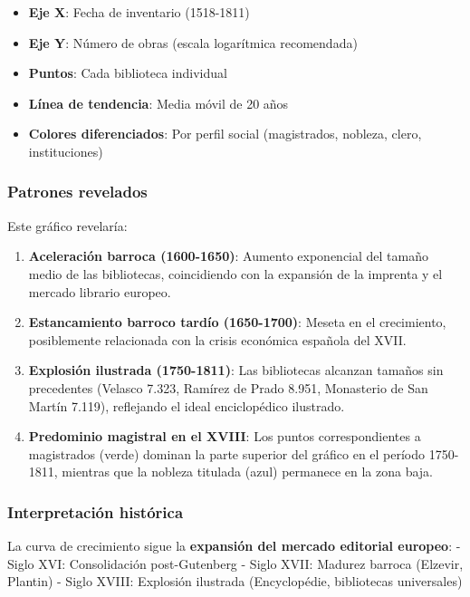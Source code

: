 \documentclass[11pt,a4paper]{article}
\begin{document}
\begin{itemize}
\item \textbf{Eje X}: Fecha de inventario (1518-1811)
\item \textbf{Eje Y}: Número de obras (escala logarítmica recomendada)
\item \textbf{Puntos}: Cada biblioteca individual
\item \textbf{Línea de tendencia}: Media móvil de 20 años
\item \textbf{Colores diferenciados}: Por perfil social (magistrados, nobleza, clero, instituciones)
\end{itemize}

\subsubsection{Patrones revelados}

Este gráfico revelaría:

\begin{enumerate}
\item \textbf{Aceleración barroca (1600-1650)}: Aumento exponencial del tamaño medio de las bibliotecas, coincidiendo con la expansión de la imprenta y el mercado librario europeo.

\item \textbf{Estancamiento barroco tardío (1650-1700)}: Meseta en el crecimiento, posiblemente relacionada con la crisis económica española del XVII.

\item \textbf{Explosión ilustrada (1750-1811)}: Las bibliotecas alcanzan tamaños sin precedentes (Velasco 7.323, Ramírez de Prado 8.951, Monasterio de San Martín 7.119), reflejando el ideal enciclopédico ilustrado.

\item \textbf{Predominio magistral en el XVIII}: Los puntos correspondientes a magistrados (verde) dominan la parte superior del gráfico en el período 1750-1811, mientras que la nobleza titulada (azul) permanece en la zona baja.
\end{enumerate}

\subsubsection{Interpretación histórica}

La curva de crecimiento sigue la \textbf{expansión del mercado editorial europeo}:
- Siglo XVI: Consolidación post-Gutenberg
- Siglo XVII: Madurez barroca (Elzevir, Plantin)
- Siglo XVIII: Explosión ilustrada (Encyclopédie, bibliotecas universales)
\end{document}
